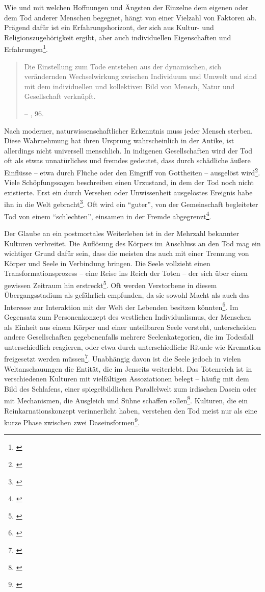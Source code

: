 \documentclass[openany,twoside,twocolumn]{book}
\let\rmarkdownfootnote\footnote%
\def\footnote{\protect\rmarkdownfootnote}
\begin{document}
Wie und mit welchen Hoffnungen und Ängsten der Einzelne dem eigenen oder
dem Tod anderer Menschen begegnet, hängt von einer Vielzahl von Faktoren
ab. Prägend dafür ist ein Erfahrungshorizont, der sich aus Kultur- und
Religionszugehörigkeit ergibt, aber auch individuellen Eigenschaften und
Erfahrungen\footnote{\textcite{mischke_umgang_1996}}.

\begin{quote}
Die Einstellung zum Tode entstehen aus der dynamischen, sich
verändernden Wechselwirkung zwischen Individuum und Umwelt und sind mit
dem individuellen und kollektiven Bild von Mensch, Natur und
Gesellschaft verknüpft.

-- \textcite{hofmann_rituelle_2008}, 96.
\end{quote}

Nach moderner, naturwissenschaftlicher Erkenntnis muss jeder Mensch
sterben. Diese Wahrnehmung hat ihren Ursprung wahrscheinlich in der
Antike, ist allerdings nicht universell menschlich. In indigenen
Gesellschaften wird der Tod oft als etwas unnatürliches und fremdes
gedeutet, dass durch schädliche äußere Einflüsse -- etwa durch Flüche
oder den Eingriff von Gottheiten -- ausgelöst wird\footnote{\textcite{condrau_mensch_1991}}.
Viele Schöpfungssagen beschreiben einen Urzustand, in dem der Tod noch
nicht existierte. Erst ein durch Versehen oder Unwissenheit ausgelöstes
Ereignis habe ihn in die Welt gebracht\footnote{\textcite{weis_zur_1986}}.
Oft wird ein ``guter'', von der Gemeinschaft begleiteter Tod von einem
``schlechten'', einsamen in der Fremde abgegrenzt\footnote{\textcite{bradbury_representations_1996}}.

Der Glaube an ein postmortales Weiterleben ist in der Mehrzahl bekannter
Kulturen verbreitet. Die Auflösung des Körpers im Anschluss an den Tod
mag ein wichtiger Grund dafür sein, dass die meisten das auch mit einer
Trennung von Körper und Seele in Verbindung bringen. Die Seele vollzieht
einen Transformationsprozess -- eine Reise ins Reich der Toten -- der
sich über einen gewissen Zeitraum hin erstreckt\footnote{\textcite{weis_zur_1986}}.
Oft werden Verstorbene in diesem Übergangsstadium als gefährlich
empfunden, da sie sowohl Macht als auch das Interesse zur Interaktion
mit der Welt der Lebenden besitzen könnten\footnote{\textcite{drubig_geschichte_1994}}.
Im Gegensatz zum Personenkonzept des westlichen Individualismus, der
Menschen als Einheit aus einem Körper und einer unteilbaren Seele
versteht, unterscheiden andere Gesellschaften gegebenenfalls mehrere
Seelenkategorien, die im Todesfall unterschiedlich reagieren, oder etwa
durch unterschiedliche Rituale wie Kremation freigesetzt werden
müssen\footnote{\textcite{graslund_prehistoric_1994}}. Unabhängig davon
ist die Seele jedoch in vielen Weltanschauungen die Entität, die im
Jenseits weiterlebt. Das Totenreich ist in verschiedenen Kulturen mit
vielfältigen Assoziationen belegt -- häufig mit dem Bild des Schlafens,
einer spiegelbildlichen Parallelwelt zum irdischen Dasein oder mit
Mechanismen, die Ausgleich und Sühne schaffen sollen\footnote{\textcite{stubbe_trauerverhalten_1988}}.
Kulturen, die ein Reinkarnationskonzept verinnerlicht haben, verstehen
den Tod meist nur als eine kurze Phase zwischen zwei
Daseinsformen\footnote{\textcite{payer_stichwort_1998}}.
\end{document}
